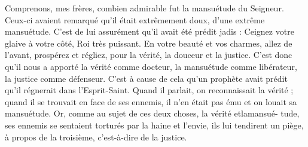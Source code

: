 Comprenons, mes frères, combien admirable fut la mansuétude du Seigneur. Ceux-ci avaient remarqué qu’il était extrêmement doux, d’une extrême mansuétude. C’est de lui assurément qu’il avait été prédit jadis : Ceignez votre glaive à votre côté, Roi très puissant. En votre beauté et vos charmes, allez de l'avant, prospérez et régliez, pour la vérité, la douceur et la justice. C’est donc qu’il nous a apporté la vérité comme docteur, la mansuétude comme libérateur, la justice comme défenseur. C’est à cause de cela qu’un prophète avait prédit qu’il régnerait dans l’Esprit-Saint. Quand il parlait, on reconnaissait la vérité ; quand il se trouvait en face de ses ennemis, il n’en était pas ému et on louait sa mansuétude. Or, comme au sujet de ces deux choses, la vérité etlamansué- tude, ses ennemis se sentaient torturés par la haine et l’envie, ils lui tendirent un piège, à propos de la troisième, c’est-à-dire de la justice.
